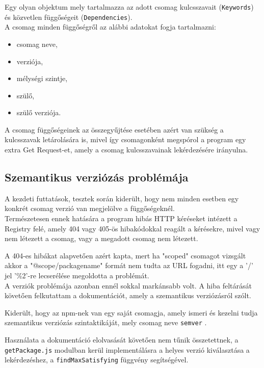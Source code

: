 Egy olyan objektum mely tartalmazza az adott csomag kulcsszavait (\texttt{Keywords}) és közvetlen függőségeit (\texttt{Dependencies}).\\

\noindent A csomag minden függőségről az alábbi adatokat fogja tartalmazni:
\begin{itemize}
	\item csomag neve,
	\item verziója,
	\item mélységi szintje,
	\item szülő,
	\item szülő verziója.
\end{itemize}

A csomag függőségeinek az összegyűjtése esetében azért van szükség a kulcsszavak letárolására is, mivel így csomagonként megspórol a program egy extra Get Request-et, amely a csomag kulcsszavainak lekérdezésére irányulna.

\subsection{Szemantikus verziózás problémája}

A kezdeti futtatások, tesztek során kiderült, hogy nem minden esetben egy konkrét csomag verzió van megjelölve a függőségeknél.\\

Természetesen ennek hatására a program hibás HTTP kéréseket intézett a Registry felé, amely 404 vagy 405-ös hibakódokkal reagált a kérésekre, mivel vagy nem létezett a csomag, vagy a megadott csomag nem létezett. 

A 404-es hibákat alapvetően azért kapta, mert ha "scoped" csomagot vizsgált akkor a "@scope/packagename" formát nem tudta az URL fogadni, itt egy a '/' jel '\%2'-re lecserélése megoldotta a problémát.\\

A verziók problémája azonban ennél sokkal markánsabb volt. A hiba feltárását követően felkutattam a dokumentációt, amely a szemantikus verziózásról szólt. 

Kiderült, hogy az npm-nek van egy saját csomagja, amely ismeri és kezelni tudja szemantikus verziózás szintaktikáját, mely csomag neve \texttt{semver} \cite{semver}. 

Használata a dokumentáció elolvasását követően nem tűnik összetettnek, a \newline\texttt{getPackage.js} modulban kerül implementálásra a helyes verzió kiválasztása a lekérdezéshez, a \texttt{findMaxSatisfying} függvény segítségével.

